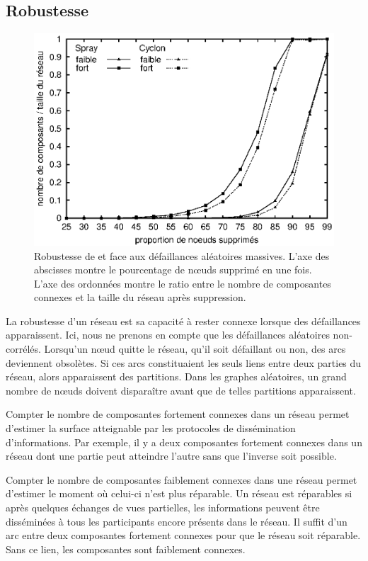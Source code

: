 \subsection{Robustesse}
\label{net:subsec:robustness}

\begin{figure}
  \centering
  \includegraphics[width=.8\textwidth]{img/spray/resilience.eps}
  \caption[Robustesse aux pannes aléatoires] {\label{net:fig:robustness}
    Robustesse de \CYCLON et \SPRAY face aux défaillances aléatoires
    massives. L'axe des abscisses montre le pourcentage de nœuds supprimé en une
    fois. L'axe des ordonnées montre le ratio entre le nombre de composantes
    connexes et la taille du réseau après suppression.}
\end{figure}

La robustesse d'un réseau est sa capacité à rester connexe lorsque des
défaillances apparaissent. Ici, nous ne prenons en compte que les défaillances
aléatoires non-corrélés. Lorsqu'un nœud quitte le réseau, qu'il soit défaillant
ou non, des arcs deviennent obsolètes. Si ces arcs constituaient les seuls liens
entre deux parties du réseau, alors apparaissent des partitions.  Dans les
graphes aléatoires, un grand nombre de nœuds doivent disparaître avant que de
telles partitions apparaissent.

Compter le nombre de composantes fortement connexes dans un réseau permet
d'estimer la surface atteignable par les protocoles de dissémination
d'informations. Par exemple, il y a deux composantes fortement connexes dans un
réseau dont une partie peut atteindre l'autre sans que l'inverse soit
possible.

Compter le nombre de composantes faiblement connexes dans une réseau permet
d'estimer le moment où celui-ci n'est plus réparable. Un réseau est réparables
si après quelques échanges de vues partielles, les informations peuvent être
disséminées à tous les participants encore présents dans le réseau. Il suffit
d'un arc entre deux composantes fortement connexes pour que le réseau soit
réparable. Sans ce lien, les composantes sont faiblement connexes.

